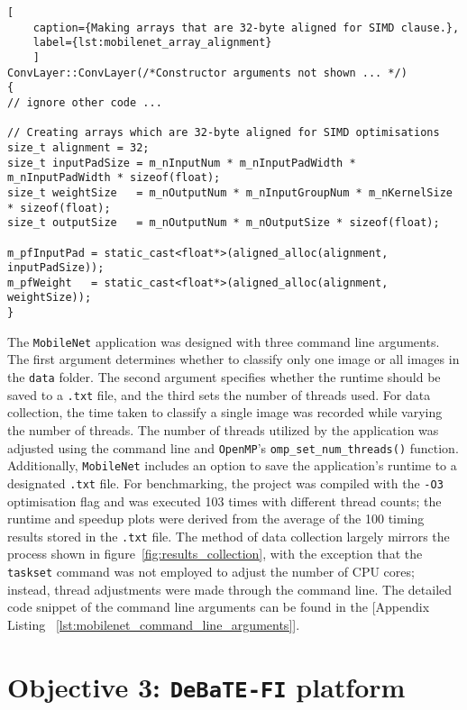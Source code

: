 \begin{lstlisting}[
	caption={Making arrays that are 32-byte aligned for SIMD clause.},
	label={lst:mobilenet_array_alignment}
	]
ConvLayer::ConvLayer(/*Constructor arguments not shown ... */) 
{
// ignore other code ... 

// Creating arrays which are 32-byte aligned for SIMD optimisations 
size_t alignment = 32;
size_t inputPadSize = m_nInputNum * m_nInputPadWidth * m_nInputPadWidth * sizeof(float);
size_t weightSize   = m_nOutputNum * m_nInputGroupNum * m_nKernelSize * sizeof(float);
size_t outputSize   = m_nOutputNum * m_nOutputSize * sizeof(float);

m_pfInputPad = static_cast<float*>(aligned_alloc(alignment, inputPadSize));
m_pfWeight   = static_cast<float*>(aligned_alloc(alignment, weightSize));
}
\end{lstlisting}

The \texttt{MobileNet} application was designed with three command line arguments. The first argument determines whether to classify only one image or all images in the \texttt{data} folder. The second argument specifies whether the runtime should be saved to a \texttt{.txt} file, and the third sets the number of threads used. For data collection, the time taken to classify a single image was recorded while varying the number of threads. The number of threads utilized by the application was adjusted using the command line and \texttt{OpenMP}'s \texttt{omp\_set\_num\_threads()} function. Additionally, \texttt{MobileNet} includes an option to save the application's runtime to a designated \texttt{.txt} file. For benchmarking, the project was compiled with the \texttt{-O3} optimisation flag and was executed 103 times with different thread counts; the runtime and speedup plots were derived from the average of the 100 timing results stored in the \texttt{.txt} file. The method of data collection largely mirrors the process shown in figure~\ref{fig:results_collection}, with the exception that the \texttt{taskset} command was not employed to adjust the number of CPU cores; instead, thread adjustments were made through the command line. The detailed code snippet of the command line arguments can be found in the [Appendix Listing ~\ref{lst:mobilenet_command_line_arguments}].  

\section{Objective 3: \texttt{DeBaTE-FI} platform}

